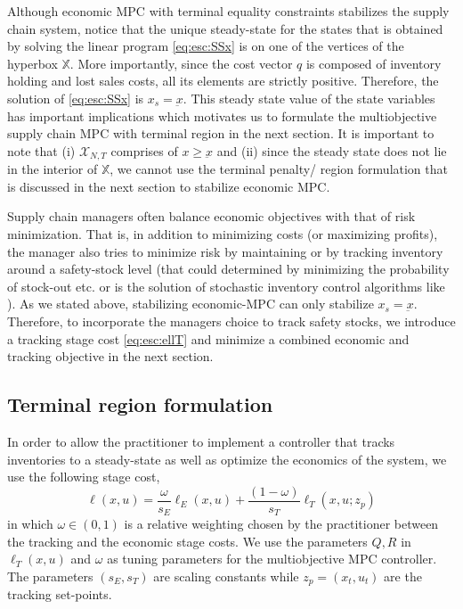 Although economic MPC with terminal equality constraints stabilizes
the supply chain system, notice that the unique steady-state for the
states that is obtained by solving the linear program \eqref{eq:esc:SSx}
is on one of the vertices of the hyperbox $\mathbb{X}$. More
importantly, since the cost vector $q$ is composed of inventory
holding and lost sales costs, all its elements are strictly
positive. Therefore, the solution of \eqref{eq:esc:SSx} is $x_s =
\underbar{x}$. This steady state value of the state variables has
important implications which motivates us to formulate the
multiobjective supply chain MPC with terminal region in the next
section. It is important to note that (i) $\mathcal{X}_{N,T}$
comprises of $x \geq \underbar{x}$ and (ii) since the steady state
does not lie in the interior of $\mathbb{X}$, we cannot use the
terminal penalty/ region formulation that is discussed in the next
section to stabilize economic MPC.

Supply chain managers often balance economic objectives with that of
risk minimization. That is, in addition to minimizing costs (or
maximizing profits), the manager also tries to minimize risk by
maintaining or by tracking inventory around a  safety-stock level
(that could determined by minimizing the probability of stock-out
etc. or is the solution of stochastic inventory control algorithms
like \citet{federgruen:1993, shang:song:2003, dong:lee:2003,
  gallego:ozer:2005,chen:song:2001}). As we stated above, stabilizing
economic-MPC can only stabilize $x_s = \underbar{x}$. Therefore, to
incorporate the managers choice to track safety stocks, we introduce
a tracking stage cost \eqref{eq:esc:ellT}
and minimize a combined economic and tracking objective in the next section.

\subsection{Terminal region formulation}
In order to allow the practitioner to implement
a controller that tracks inventories to a steady-state as well as
optimize the economics of the system, we use the following stage cost,
\begin{equation}
\label{eq:esc:ell}
\ell(x,u) = \frac{\omega}{s_E} \ell_E(x,u) + \frac{(1-\omega)}{s_T} \ell_T(x,u;z_p)
\end{equation}
in which $\omega \in (0,1)$ is a relative weighting chosen by the
practitioner between the tracking and the economic stage costs. We use
the parameters $Q,R$ in $\ell_T(x,u)$ and $\omega$ as tuning
parameters for the multiobjective MPC controller. The parameters
$(s_E,s_T)$ are scaling constants while $z_p=(x_t,u_t)$ are the tracking
set-points.

